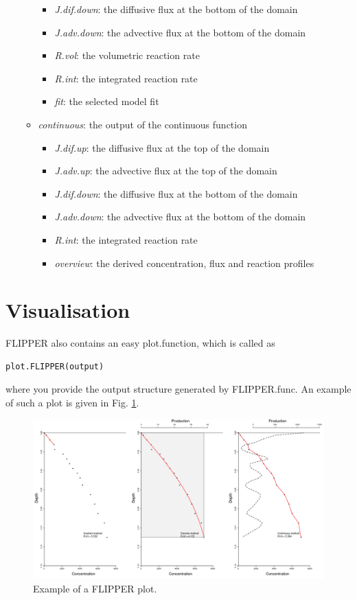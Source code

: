 \documentclass[10pt]{article}
\begin{document}
\begin{itemize}
\begin{itemize}
\begin{itemize}
\item  \textit{J.dif.down}: the diffusive flux at the bottom of the domain
\item  \textit{J.adv.down}: the advective flux at the bottom of the domain
\item  \textit{R.vol}: the volumetric reaction rate
\item  \textit{R.int}: the integrated reaction rate
\item  \textit{fit}: the selected model fit 
\end{itemize}
 \item \textit{continuous}: the output of the continuous function
 \begin{itemize}
\item  \textit{J.dif.up}: the diffusive flux at the top of the domain
\item  \textit{J.adv.up}: the advective flux at the top of the domain
\item  \textit{J.dif.down}: the diffusive flux at the bottom of the domain
\item  \textit{J.adv.down}: the advective flux at the bottom of the domain
\item  \textit{R.int}: the integrated reaction rate
\item  \textit{overview}: the derived concentration, flux and reaction profiles
\end{itemize}
\end{itemize}

\end{itemize}

\section{Visualisation}

FLIPPER also contains an easy plot.function, which is called as
\begin{verbatim}
plot.FLIPPER(output)
\end{verbatim}
where you provide the output structure generated by FLIPPER.func. An example of such a plot is given in Fig. \ref{fig_Flipperplot}.

\begin{figure}[!htbp]
	\includegraphics[width=\linewidth]{FLIPPERDOC_Figures/FLIPPER_plotexample.png}
	\caption{Example of a FLIPPER plot.}
	\label{fig_Flipperplot}
\end{figure}
\end{document}
